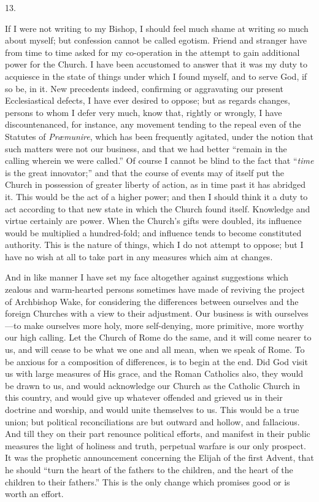 13.

If I were not writing to my Bishop, I should feel
much shame at writing so much about myself; but confession cannot be
called egotism. Friend and stranger have from time to time asked for
my co-operation in the attempt to gain additional power for the
Church. I have been accustomed to answer that it was my duty to
acquiesce in the state of things under which I found myself, and to
serve God, if so be, in it. New precedents indeed, confirming or
aggravating our present Ecclesiastical defects, I have ever desired to
oppose; but as regards changes, persons to whom I defer very much,
know that, rightly or wrongly, I have discountenanced, for instance,
any movement tending to the repeal even of the Statutes of \emph{Præmunire},
which has been frequently agitated, under the notion that such matters
were not our business, and that we had better ``remain in the calling
wherein we were called.'' Of course I cannot be blind to the fact that ``\emph{time}
is the great innovator;'' and that the course of events may of itself
put the Church in possession of greater liberty of action, as in time
past it has abridged it. This would be the act of a higher power; and
then I should think it a duty to act according to that new state
in which the Church found itself. Knowledge and virtue certainly are
power. When the Church's gifts were doubled, its influence would be
multiplied a hundred-fold; and influence tends to become constituted
authority. This is the nature of things, which I do not attempt to
oppose; but I have no wish at all to take part in any measures which
aim at changes.

And in like manner I have set my face altogether
against suggestions which zealous and warm-hearted persons sometimes
have made of reviving the project of Archbishop Wake, for considering
the differences between ourselves and the foreign Churches with a view
to their adjustment. Our business is with ourselves—to make
ourselves more holy, more self-denying, more primitive, more worthy
our high calling. Let the Church of Rome do the same, and it will come
nearer to us, and will cease to be what we one and all mean, when we
speak of Rome. To be anxious for a composition of differences, is to
begin at the end. Did God visit us with large measures of His grace,
and the Roman Catholics also, they would be drawn to us, and would
acknowledge our Church as the Catholic Church in this country, and
would give up whatever offended and grieved us in their doctrine and
worship, and would unite themselves to us. This would be a true union;
but political reconciliations are but outward and hollow, and
fallacious. And till they on their part renounce political efforts,
and manifest in their public measures the light of holiness and truth,
perpetual warfare is our only prospect. It was the prophetic
announcement concerning the Elijah of the first Advent, that he should
``turn the heart of the fathers to the children, and the heart of the
children to their fathers.'' This is the only change which promises
good or is worth an effort.

